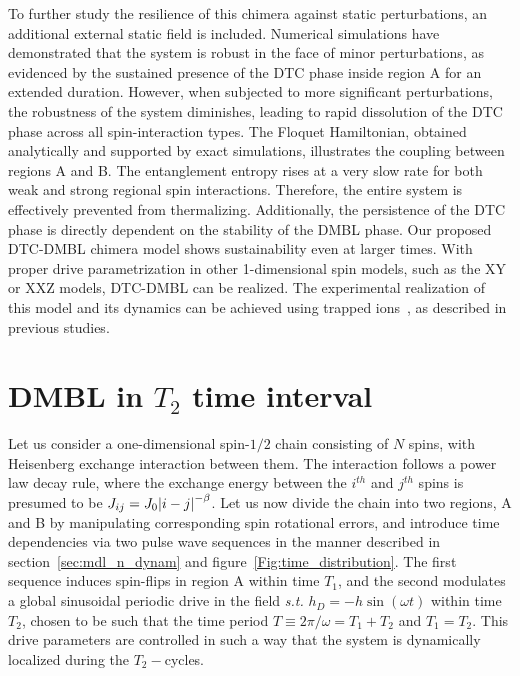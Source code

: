\documentclass[12pt]{iopart}
\begin{document}
To further study the resilience of this chimera against static perturbations, an additional external static field is included. Numerical simulations have demonstrated that the system is robust in the face of minor perturbations, as evidenced by the sustained presence of the DTC phase inside region A for an extended duration. However, when subjected to more significant perturbations, the robustness of the system diminishes, leading to rapid dissolution of the DTC phase across all spin-interaction types. The Floquet Hamiltonian, obtained analytically and supported by exact simulations, illustrates the coupling between regions A and B. The entanglement entropy rises at a very slow rate for both weak and strong regional spin interactions. Therefore, the entire system is effectively prevented from thermalizing. Additionally, the persistence of the DTC phase is directly dependent on the stability of the DMBL phase. Our proposed DTC-DMBL chimera model shows sustainability even at larger times.  With proper drive parametrization in other 1-dimensional spin models, such as the XY or XXZ models, DTC-DMBL can be realized. The experimental realization of this model and its dynamics can be achieved using trapped ions~\cite{sakurai_phys_nodate, Friedenauer2008}, as described in previous studies.
	
\medskip

\clearpage

\appendix
\section{\label{sec:AppendixA} DMBL in $T_2$ time interval}

Let us consider a one-dimensional spin-$1/2$ chain consisting of $N$ spins, with Heisenberg exchange interaction between them. The interaction follows a power law decay rule, where the exchange energy between the $i^{th}$ and $j^{th}$ spins is presumed to be  $J_{ij}=J_0\abs{i-j}^{-\beta}$. Let us now  divide the chain into two regions, A and B by manipulating corresponding spin rotational errors, and introduce time dependencies via two pulse wave sequences in the manner described in section~\ref{sec:mdl_n_dynam} and figure~\ref{Fig:time_distribution}. The first sequence  induces spin-flips in region A within time $T_1$, and the second modulates a global sinusoidal periodic drive in the field \textit{s.t.} $h_D = -h\sin(\omega t)$ within time $T_2$, chosen to be such that the time period $T\equiv 2\pi/\omega = T_1 + T_2$ and $T_1 = T_2$. This drive parameters are controlled in such a way that the system is dynamically localized during the $T_2-$cycles.
\end{document}
